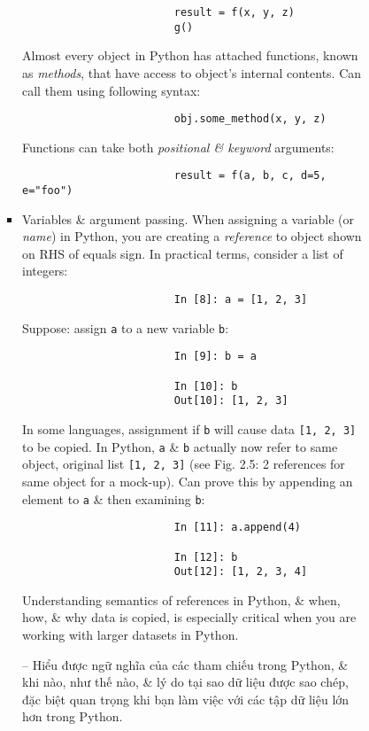 \documentclass{article}
\begin{document}
\begin{enumerate}
\begin{itemize}
\begin{itemize}
\begin{itemize}
\begin{itemize}
\begin{verbatim}
						result = f(x, y, z)
						g()
					\end{verbatim}
					Almost every object in Python has attached functions, known as {\it methods}, that have access to object's internal contents. Can call them using following syntax:
					\begin{verbatim}
						obj.some_method(x, y, z)
					\end{verbatim}
					Functions can take both {\it positional \& keyword} arguments:
					\begin{verbatim}
						result = f(a, b, c, d=5, e="foo")
					\end{verbatim}
					\item {\sf Variables \& argument passing.} When assigning a variable (or {\it name}) in Python, you are creating a {\it reference} to object shown on RHS of equals sign. In practical terms, consider a list of integers:
					\begin{verbatim}
						In [8]: a = [1, 2, 3]
					\end{verbatim}
					Suppose: assign {\tt a} to a new variable {\tt b}:
					\begin{verbatim}
						In [9]: b = a
						
						In [10]: b
						Out[10]: [1, 2, 3]
					\end{verbatim}
					In some languages, assignment if {\tt b} will cause data {\tt[1, 2, 3]} to be copied. In Python, {\tt a} \& {\tt b} actually now refer to same object, original list {\tt[1, 2, 3]} (see {\sf Fig. 2.5: 2 references for same object} for a mock-up). Can prove this by appending an element to {\tt a} \& then examining {\tt b}:
					\begin{verbatim}
						In [11]: a.append(4)
						
						In [12]: b
						Out[12]: [1, 2, 3, 4]
					\end{verbatim}
					Understanding semantics of references in Python, \& when, how, \& why data is copied, is especially critical when you are working with larger datasets in Python.
					
					-- Hiểu được ngữ nghĩa của các tham chiếu trong Python, \& khi nào, như thế nào, \& lý do tại sao dữ liệu được sao chép, đặc biệt quan trọng khi bạn làm việc với các tập dữ liệu lớn hơn trong Python.
					

\end{itemize}
\end{itemize}
\end{itemize}
\end{itemize}
\end{enumerate}
\end{document}

